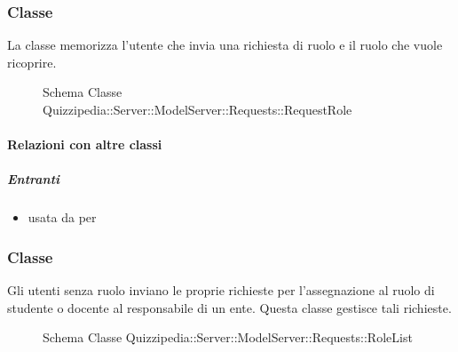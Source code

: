 \subsubsection{Classe }
La classe memorizza l'utente che invia una richiesta di ruolo e il ruolo che vuole ricoprire.
\begin{figure}[H]
\centering
\noindent{}
\caption[Schema Classe RequestRole]{Schema Classe Quizzipedia::Server::ModelServer::Requests::RequestRole}
\end{figure}
\paragraph{Relazioni con altre classi}
\subparagraph{Entranti}
\begin{itemize}
\item usata da  per 
\end{itemize}
\subsubsection{Classe }
Gli utenti senza ruolo inviano le proprie richieste per l'assegnazione al ruolo di studente o docente al responsabile di un ente. Questa classe gestisce tali richieste.
\begin{figure}[H]
\centering
\noindent{}
\caption[Schema Classe RoleList]{Schema Classe Quizzipedia::Server::ModelServer::Requests::RoleList}
\end{figure}
